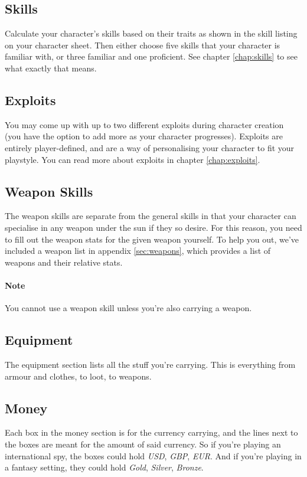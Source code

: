 \subsection{Skills}
Calculate your character's skills based on their traits as shown in the skill listing on your character sheet.
Then either choose five skills that your character is familiar with, or three familiar and one proficient.
See chapter \ref{chap:skills} to see what exactly that means.

\subsection{Exploits}
You may come up with up to two different exploits during character creation (you have the option to add more as your character progresses).
Exploits are entirely player-defined, and are a way of personalising your character to fit your playstyle.
You can read more about exploits in chapter \ref{chap:exploits}.

\subsection{Weapon Skills}
The weapon skills are separate from the general skills in that your character can specialise in any weapon under the sun if they so desire.
For this reason, you need to fill out the weapon stats for the given weapon yourself.
To help you out, we've included a weapon list in appendix \ref{sec:weapons}, which provides a list of weapons and their relative stats.

\paragraph{Note} You cannot use a weapon skill unless you're also carrying a weapon.

\subsection{Equipment}
The equipment section lists all the stuff you're carrying.
This is everything from armour and clothes, to loot, to weapons.

\subsection{Money}
Each box in the money section is for the currency carrying, and the lines next to the boxes are meant for the amount of said currency.
So if you're playing an international spy, the boxes could hold \textit{USD}, \textit{GBP}, \textit{EUR}.
And if you're playing in a fantasy setting, they could hold \textit{Gold}, \textit{Silver}, \textit{Bronze}.
